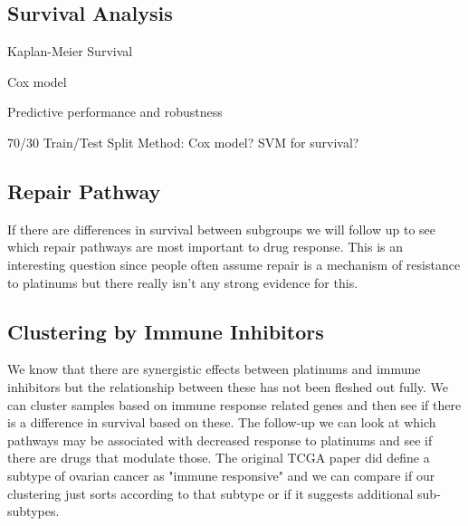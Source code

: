 \documentclass{article}
\begin{document}
\subsection{Survival Analysis}
Kaplan-Meier Survival 

Cox model

Predictive performance and robustness

70/30 Train/Test Split
Method: Cox model? SVM for survival?

\subsection{Repair Pathway}

If there are differences in survival between subgroups we will follow up to see which repair pathways are most important to drug response. This is an interesting question since people often assume repair is a mechanism of resistance to platinums but there really isn't any strong evidence for this.

\subsection{Clustering by Immune Inhibitors}

We know that there are synergistic effects between platinums and immune inhibitors but the relationship between these has not been fleshed out fully.  We can cluster samples based on immune response related genes and then see if there is a difference in survival based on these. The follow-up we can look at which pathways may be associated with decreased response to platinums and see if there are drugs that modulate those. The original TCGA paper did define a subtype of ovarian cancer as "immune responsive" and we can compare if our clustering just sorts according to that subtype or if it suggests additional sub-subtypes. 

{}

\end{document}
